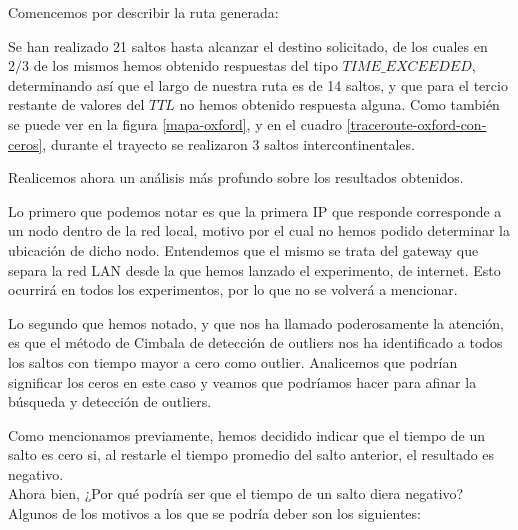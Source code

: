 Comencemos por describir la ruta generada:

Se han realizado 21 saltos hasta alcanzar el destino solicitado, de los cuales en $2/3$ de los mismos hemos obtenido respuestas del tipo $TIME\_EXCEEDED$, determinando así que el largo de nuestra ruta es de 14 saltos, y que para el tercio restante de valores del $TTL$ no hemos obtenido respuesta alguna. Como también se puede ver en la figura \ref{mapa-oxford}, y en el cuadro \ref{traceroute-oxford-con-ceros}, durante el trayecto se realizaron 3 saltos intercontinentales.

Realicemos ahora un análisis más profundo sobre los resultados obtenidos.

Lo primero que podemos notar es que la primera IP que responde corresponde a un nodo dentro de la red local, motivo por el cual no hemos podido determinar la ubicación de dicho nodo. Entendemos que el mismo se trata del gateway que separa la red LAN desde la que hemos lanzado el experimento, de internet. Esto ocurrirá en todos los experimentos, por lo que no se volverá a mencionar. 

Lo segundo que hemos notado, y que nos ha llamado poderosamente la atención, es que el método de Cimbala de detección de outliers nos ha identificado a todos los saltos con tiempo mayor a cero como outlier. Analicemos que podrían significar los ceros en este caso y veamos que podríamos hacer para afinar la búsqueda y detección de outliers.

Como mencionamos previamente, hemos decidido indicar que el tiempo de un salto es cero si, al restarle el tiempo promedio del salto anterior, el resultado es negativo. \\
Ahora bien, ¿Por qué podría ser que el tiempo de un salto diera negativo? \\
Algunos de los motivos a los que se podría deber son los siguientes:

